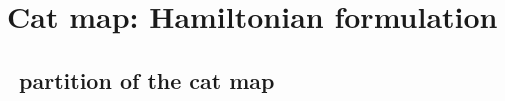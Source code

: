 
\section{Cat map: Hamiltonian formulation}
\label{s:catMapHam}

\subsection{\AW\ partition of the cat map \statesp}
\label{s:catAW}

